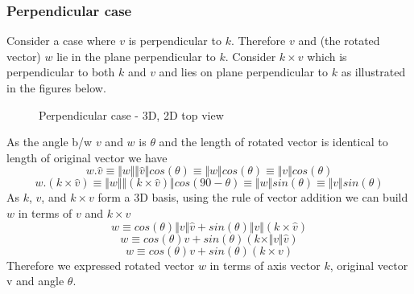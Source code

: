 \documentclass[12pt]{article}
\begin{document}
\subsubsection*{Perpendicular case}
Consider a case where $v$ is perpendicular to $k$.
Therefore $v$ and (the rotated vector) $w$ lie in the plane perpendicular to $k$.
Consider $k \times v$ which is perpendicular to both $k$ and $v$ and lies on plane perpendicular to $k$ as illustrated in the figures below.
\begin{figure}[h]
  \centering

  \caption{Perpendicular case - 3D, 2D top view}
\end{figure}

As the angle b/w $v$ and $w$ is $\theta$ and the length of rotated vector is identical to length of original vector we have
\[
  w . \hat{v} \equiv \Vert w \Vert \Vert \hat{v} \Vert cos(\theta) \equiv \Vert w \Vert cos(\theta) \equiv \Vert v \Vert cos(\theta)
\]
\[
  w . (k \times \hat{v}) \equiv \Vert w \Vert \Vert (k \times \hat{v}) \Vert cos(90 - \theta) \equiv \Vert w \Vert sin(\theta) \equiv \Vert v \Vert sin(\theta)
\]
As $k$, $v$, and $k \times v $ form a 3D basis, using the rule of vector addition we can build $w$ in terms of $v$ and $k \times v$
\[
  w \equiv cos(\theta) \Vert v \Vert \hat{v} + sin(\theta) \Vert v \Vert (k \times \hat{v})
\]
\[
  w \equiv cos(\theta) v + sin(\theta) (k \times \Vert v \Vert \hat{v})
\]
\[
  w \equiv cos(\theta) v + sin(\theta) (k \times v)
\]
Therefore we expressed rotated vector $w$ in terms of axis vector $k$, original vector v and angle $\theta$.
\end{document}
